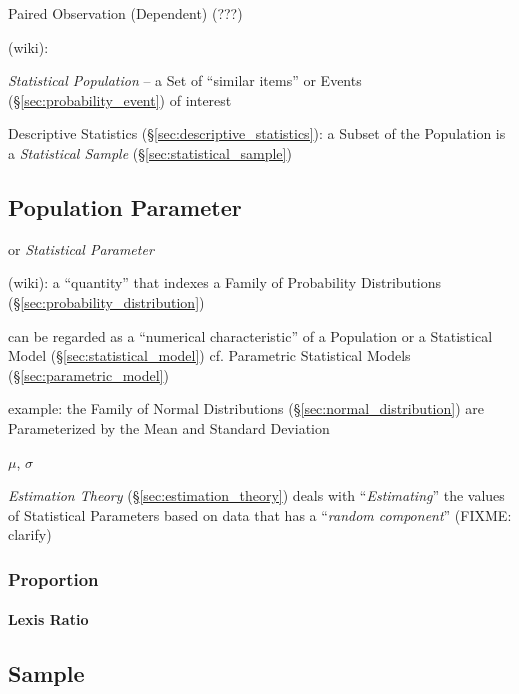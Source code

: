 Paired Observation (Dependent) (???)

(wiki):

\emph{Statistical Population} -- a Set of ``similar items'' or Events
(\S\ref{sec:probability_event}) of interest

Descriptive Statistics (\S\ref{sec:descriptive_statistics}): a Subset of the
Population is a \emph{Statistical Sample} (\S\ref{sec:statistical_sample})



\subsection{Population Parameter}\label{sec:population_parameter}

or \emph{Statistical Parameter}

(wiki): a ``quantity'' that indexes a Family of Probability Distributions
(\S\ref{sec:probability_distribution})

can be regarded as a ``numerical characteristic'' of a Population or a
Statistical Model (\S\ref{sec:statistical_model}) \fist cf. Parametric
Statistical Models (\S\ref{sec:parametric_model})

example: the Family of Normal Distributions (\S\ref{sec:normal_distribution})
are Parameterized by the Mean and Standard Deviation

$\mu$, $\sigma$

\fist \emph{Estimation Theory} (\S\ref{sec:estimation_theory}) deals with
``\emph{Estimating}'' the values of Statistical Parameters
based on data that has a ``\emph{random component}'' (FIXME: clarify)



\subsubsection{Proportion}\label{sec:statistical_proportion}

\paragraph{Lexis Ratio}\label{sec:lexis_ratio}\hfill



\subsection{Sample}\label{sec:sample}

